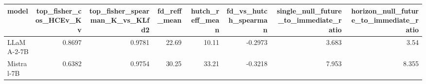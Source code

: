 \begin{tabular}{lrrrrrrr}
\toprule
model & top_fisher_cos_HCEv_Kv & top_fisher_spearman_K_vs_KLfd2 & fd_reff_mean & hutch_reff_mean & fd_vs_hutch_spearman & single_null_future_to_immediate_ratio & horizon_null_future_to_immediate_ratio \\
\midrule
LLaMA-2-7B & 0.8697 & 0.9781 & 22.69 & 10.11 & -0.2973 & 3.683 & 3.54 \\
Mistral-7B & 0.6382 & 0.9754 & 30.25 & 33.21 & -0.3218 & 7.953 & 8.355 \\
\bottomrule
\end{tabular}

